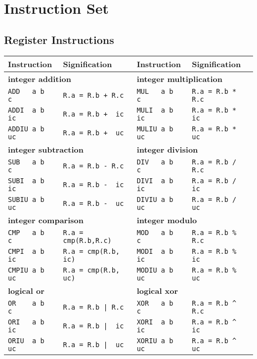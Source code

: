 \documentclass[10pt,a4paper]{article}
\begin{document}
\section{Instruction Set}
\subsection{Register Instructions}

\begin{tabular}{|l|l||l|l|}
\hline
\bf Instruction & \bf Signification & \bf Instruction & \bf Signification \\ \hline \hline

\multicolumn{2}{|l||}{\bf integer addition} & \multicolumn{2}{|l|}{\bf integer multiplication} \\ \hline
\verb#ADD   a b  c# & \verb#R.a = R.b + R.c#      & \verb#MUL   a b  c# & \verb#R.a = R.b * R.c# \\
\verb#ADDI  a b ic# & \verb#R.a = R.b +  ic#      & \verb#MULI  a b ic# & \verb#R.a = R.b *  ic# \\
\verb#ADDIU a b uc# & \verb#R.a = R.b +  uc#      & \verb#MULIU a b uc# & \verb#R.a = R.b *  uc# \\ \hline

\multicolumn{2}{|l||}{\bf integer subtraction} & \multicolumn{2}{|l|}{\bf integer division} \\ \hline
\verb#SUB   a b  c# & \verb#R.a = R.b - R.c#      & \verb#DIV   a b  c# & \verb#R.a = R.b / R.c# \\
\verb#SUBI  a b ic# & \verb#R.a = R.b -  ic#      & \verb#DIVI  a b ic# & \verb#R.a = R.b /  ic# \\
\verb#SUBIU a b uc# & \verb#R.a = R.b -  uc#      & \verb#DIVIU a b uc# & \verb#R.a = R.b /  uc# \\ \hline

\multicolumn{2}{|l||}{\bf integer comparison} & \multicolumn{2}{|l|}{\bf integer modulo} \\ \hline
\verb#CMP   a b  c# & \verb#R.a = cmp(R.b,R.c)# & \verb#MOD   a b  c# & \verb#R.a = R.b % R.c# \\
\verb#CMPI  a b ic# & \verb#R.a = cmp(R.b, ic)# & \verb#MODI  a b ic# & \verb#R.a = R.b %  ic# \\
\verb#CMPIU a b uc# & \verb#R.a = cmp(R.b, uc)# & \verb#MODIU a b uc# & \verb#R.a = R.b %  uc# \\ \hline

\multicolumn{2}{|l||}{\bf logical or} & \multicolumn{2}{|l|}{\bf logical xor} \\ \hline
\verb#OR    a b  c# & \verb#R.a = R.b | R.c# &   \verb#XOR   a b  c# & \verb#R.a = R.b ^ R.c#   \\
\verb#ORI   a b ic# & \verb#R.a = R.b |  ic# &   \verb#XORI  a b ic# & \verb#R.a = R.b ^  ic#   \\
\verb#ORIU  a b uc# & \verb#R.a = R.b |  uc# &   \verb#XORIU a b uc# & \verb#R.a = R.b ^  uc#   \\ \hline


\end{tabular}
\end{document}
